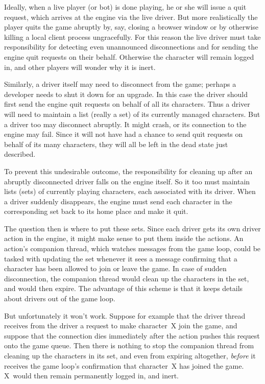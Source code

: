 Ideally, when a live player (or bot) is done playing, he or she will
issue a quit request, which arrives at the engine via the live
driver. But more realistically the player quits the game abruptly by,
say, closing a browser window or by otherwise killing a local client
process ungracefully. For this reason the live driver must take
responsibility for detecting even unannounced disconnections and for
sending the engine quit requests on their behalf. Otherwise the
character will remain logged in, and other players will
wonder why it is inert.

Similarly, a driver itself may need to disconnect from the game;
perhaps a developer needs to shut it down for an upgrade.  In this
case the driver should first send the engine quit requests on behalf
of all its characters. Thus a driver will need to maintain a list
(really a set) of its currently managed characters.  But a driver too
may disconnect abruptly.  It might crash, or its connection to the
engine may fail.  Since it will not have had a chance to send quit
requests on behalf of its many characters, they will all be left in
the dead state just described.

To prevent this undesirable outcome, the responsibility for cleaning
up after an abruptly disconnected driver falls on the engine
itself. So it too must maintain lists (sets) of currently playing
characters, each associated with its driver. When a driver suddenly
disappears, the engine must send each character in the corresponding
set back to its home place and make it quit.

The question then is where to put these sets.
Since each driver gets its own driver action in the engine, it might make
sense to put them inside the actions.
An action's companion thread, which watches messages from
the game loop, could be tasked with updating the set whenever it sees a
message confirming that a character has been allowed to join or leave
the game.
In case of sudden disconnection, the companion thread would clean up the
characters in the set, and would then expire.
The advantage of this scheme is that it keeps details about drivers
out of the game loop.

But unfortunately it won't work.
Suppose for example that the driver thread receives from the driver a request
to make character~X join the game, and suppose that the connection dies
immediately after the action pushes this request onto the game queue.
Then there is nothing to stop the companion thread from cleaning up the
characters in its set, and even from expiring altogether, {\em before} it
receives the game loop's confirmation that character~X has joined the game.
X~would then remain permanently logged in, and inert.

